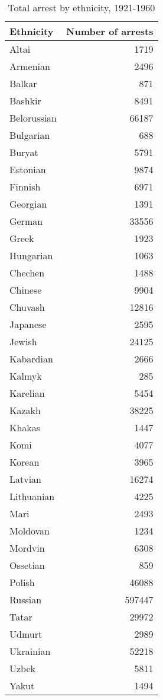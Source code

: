 \begin{table}[t]

\caption{\label{tab:total_arrests_by_ethnicity}Total arrest by ethnicity, 1921-1960}
\centering
\begin{tabular}{lr}
\toprule
Ethnicity & Number of arrests\\
\midrule
Altai & 1719\\
Armenian & 2496\\
Balkar & 871\\
Bashkir & 8491\\
Belorussian & 66187\\
\addlinespace
Bulgarian & 688\\
Buryat & 5791\\
Estonian & 9874\\
Finnish & 6971\\
Georgian & 1391\\
\addlinespace
German & 33556\\
Greek & 1923\\
Hungarian & 1063\\
Chechen & 1488\\
Chinese & 9904\\
\addlinespace
Chuvash & 12816\\
Japanese & 2595\\
Jewish & 24125\\
Kabardian & 2666\\
Kalmyk & 285\\
\addlinespace
Karelian & 5454\\
Kazakh & 38225\\
Khakas & 1447\\
Komi & 4077\\
Korean & 3965\\
\addlinespace
Latvian & 16274\\
Lithuanian & 4225\\
Mari & 2493\\
Moldovan & 1234\\
Mordvin & 6308\\
\addlinespace
Ossetian & 859\\
Polish & 46088\\
Russian & 597447\\
Tatar & 29972\\
Udmurt & 2989\\
\addlinespace
Ukrainian & 52218\\
Uzbek & 5811\\
Yakut & 1494\\
\bottomrule
\end{tabular}
\end{table}